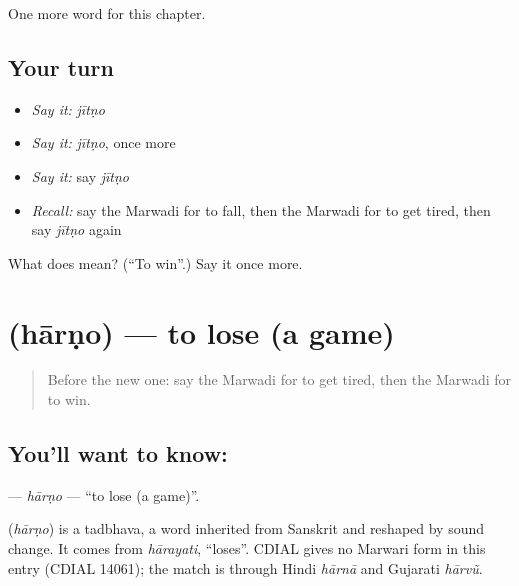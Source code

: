 \begin{grammarlens}[title={What you've built}]
One more word for this chapter.
\end{grammarlens}

\subsection*{Your turn}
\begin{itemize}
\raggedright
  \item \emph{Say it:} \emph{jītṇo}
  \item \emph{Say it:} \emph{jītṇo}, once more
  \item \emph{Say it:} say \emph{jītṇo}
  \item \emph{Recall:} say the Marwadi for to fall, then the Marwadi for to get tired, then say \emph{jītṇo} again
\end{itemize}

\begin{tcolorbox}[breakable,colback=teal!4,colframe=teal!35!black,title={Before you move on}]
What does  mean? (\textquotedblleft{}To win\textquotedblright{}.) Say it once more.
\end{tcolorbox}
\section[\texorpdfstring{\mw{हारणो} (hārṇo)}{हारणो (hārṇo)}]{ (hārṇo) — to lose (a game)}

\label{lesson:MW-C109-harno}



\begin{quote}
Before the new one: say the Marwadi for to get tired, then the Marwadi for to win.
\end{quote}

\subsection*{You'll want to know: }
\textbf{} — \emph{hārṇo} — \textquotedblleft{}to lose (a game)\textquotedblright{}.

\begin{cousinweb}
\textbf{} (\emph{hārṇo}) is a tadbhava, a word inherited from Sanskrit and reshaped by sound change. It comes from \emph{hārayati}, \textquotedblleft{}loses\textquotedblright{}. CDIAL gives no Marwari form in this entry (CDIAL 14061); the match is through Hindi \emph{hārnā} and Gujarati \emph{hārvũ}.
\end{cousinweb}

